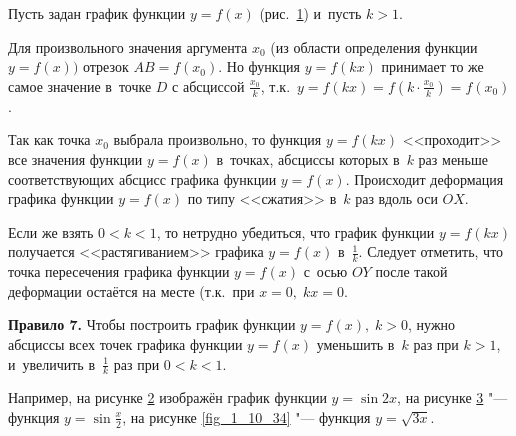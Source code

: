 
Пусть задан график функции $y = f(x)$ (рис.\ \ref{fig_1_10_31}) и~пусть $k>1$.

\begin{figure}\label{fig_1_10_31}
\end{figure}

Для произвольного значения аргумента $x_{0}$ (из области определения
функции $y = f(x))$ отрезок $AB = f(x_{0})$.
Но функция $y = f(kx)$ принимает то же самое значение в~точке $D$
с абсциссой $\displaystyle \frac{x_{0}}{k}$,
т.к.\ $\displaystyle y = f(kx) = f \left( k \cdot \frac{x_{0}}{k} \right) = f(x_{0})$.

Так как точка $x_{0}$ выбрала произвольно, то функция $y = f(kx)$
<<проходит>> все значения функции $y = f(x)$ в~точках, абсциссы которых
в~$k$ раз меньше соответствующих абсцисс графика функции $y = f(x)$.
Происходит деформация графика функции $y = f(x)$ по типу <<сжатия>>
в~$k$ раз вдоль оси $OX$.

Если же взять $0 < k < 1$, то нетрудно убедиться, что график функции
$y = f(kx)$ получается <<растягиванием>> графика
$y = f(x)$ в~$\displaystyle \frac{1}{k}$.
Следует отметить, что точка пересечения графика функции $y = f(x)$
с~осью $OY$ после такой деформации остаётся на месте
(т.к.\ при $x = 0, \; kx = 0$.

\textbf{Правило 7.} Чтобы построить график функции $y = f(x), \; k > 0$,
нужно абсциссы всех точек графика функции $y = f(x)$ уменьшить
в~$k$ раз при $k > 1$, и~увеличить в~$\displaystyle \frac{1}{k}$
раз при $0 < k < 1$.

\begin{figure}
\end{figure}

Например, на рисунке \ref{fig_1_10_32} изображён график функции $y = \sin 2x$,
на рисунке \ref{fig_1_10_33} "--- функция $\displaystyle y = \sin \frac{x}{2}$,
на рисунке \ref{fig_1_10_34} "--- функция $y = \sqrt{3x}$.

\begin{figure}\label{fig_1_10_32}
\end{figure}

\begin{figure}\label{fig_1_10_33}
\end{figure}


